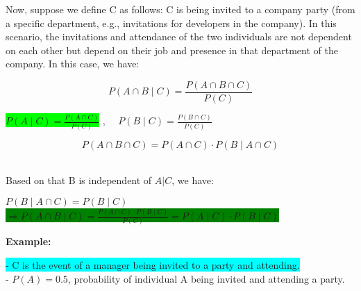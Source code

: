 \documentclass[12pt]{article}
\begin{document}
Now, suppose we define C as follows:  
C is being invited to a company party (from a specific department, e.g., invitations for developers in the company).
In this scenario, the invitations and attendance of the two individuals are not dependent on each other but depend on their job and presence in that department of the company.  
\newpage
In this case, we have:  

\begin{center}

    \[
   P(A \cap B \mid C) = \frac{P(A \cap B \cap C)}{P(C)}
   \]

   \colorbox{lime}{\(   P(A \mid C) = \frac{P(A \cap C)}{P(C)}\)}
   ,
   \(\quad P(B \mid C) = \frac{P(B \cap C)}{P(C)}\)

    \[
   P(A \cap B \cap C) = P(A \cap C) \cdot P(B \mid A \cap C)
   \]\\[15pt]
    
\end{center}


Based on that B is independent of \(A | C\), we have:


\begin{center}

    \(   P(B \mid A \cap C) = P(B \mid C)\) \\[15pt]
   
    \colorbox{green}{\( \Rightarrow P(A \cap B \mid C) = \frac{P(A \cap C) \cdot P(B \mid C)}{P(C)} = P(A \mid C) \cdot P(B \mid C) \)}\\[30pt]
    

\end{center}


\textbf{Example:}


\colorbox{cyan}{- C is the event of a manager being invited to a party and attending.}\\

- $P(A)=0.5$, probability of individual A being invited and attending a party.
\end{document}
